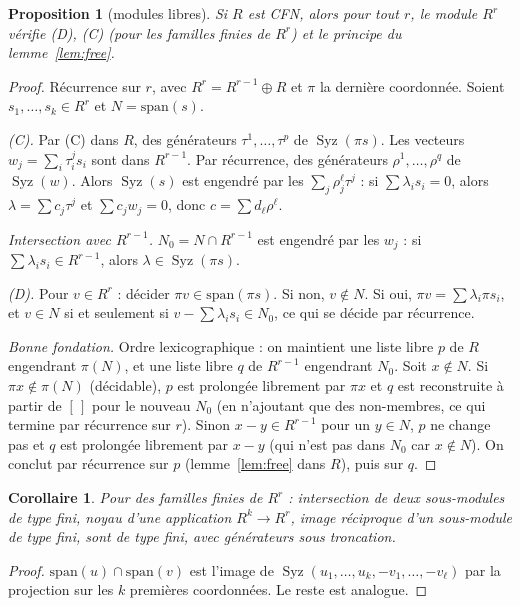 \documentclass[11pt]{amsart}
\newtheorem{proposition}[theorem]{Proposition}
\newtheorem{corollary}[theorem]{Corollaire}
\theoremstyle{definition}
\theoremstyle{remark}
\DeclareMathOperator{\Syz}{Syz}
\newcommand{\sm}{\mathrm{span}}
\begin{document}
\begin{proposition}[modules libres]\label{prop:free}
Si $R$ est CFN, alors pour tout $r$, le module $R^r$ vérifie (D), (C)
(pour les familles finies de $R^r$) et le principe du lemme~\ref{lem:free}.
\end{proposition}

\begin{proof}
Récurrence sur $r$, avec $R^r=R^{r-1}\oplus R$ et $\pi$ la dernière
coordonnée. Soient $s_1,\dots,s_k\in R^r$ et $N=\sm(s)$.

\emph{(C).} Par (C) dans $R$, des générateurs $\tau^1,\dots,\tau^p$ de
$\Syz(\pi s)$. Les vecteurs $w_j=\sum_i\tau^j_is_i$ sont dans $R^{r-1}$.
Par récurrence, des générateurs $\rho^1,\dots,\rho^q$ de $\Syz(w)$.
Alors $\Syz(s)$ est engendré par les $\sum_j\rho^\ell_j\tau^j$ : si
$\sum\lambda_is_i=0$, alors $\lambda=\sum c_j\tau^j$ et $\sum c_jw_j=0$,
donc $c=\sum d_\ell\rho^\ell$.

\emph{Intersection avec $R^{r-1}$.} $N_0=N\cap R^{r-1}$ est engendré par
les $w_j$ : si $\sum\lambda_is_i\in R^{r-1}$, alors $\lambda\in\Syz(\pi s)$.

\emph{(D).} Pour $v\in R^r$ : décider $\pi v\in\sm(\pi s)$. Si non,
$v\notin N$. Si oui, $\pi v=\sum\lambda_i\pi s_i$, et $v\in N$ si et
seulement si $v-\sum\lambda_is_i\in N_0$, ce qui se décide par
récurrence.

\emph{Bonne fondation.} Ordre lexicographique : on maintient une liste
libre $p$ de $R$ engendrant $\pi(N)$, et une liste libre $q$ de $R^{r-1}$
engendrant $N_0$. Soit $x\notin N$. Si $\pi x\notin\pi(N)$ (décidable),
$p$ est prolongée librement par $\pi x$ et $q$ est reconstruite à partir
de $[\,]$ pour le nouveau $N_0$ (en n'ajoutant que des non-membres, ce
qui termine par récurrence sur $r$). Sinon $x-y\in R^{r-1}$ pour un
$y\in N$, $p$ ne change pas et $q$ est prolongée librement par $x-y$
(qui n'est pas dans $N_0$ car $x\notin N$). On conclut par récurrence
sur $p$ (lemme~\ref{lem:free} dans $R$), puis sur $q$.
\end{proof}

\begin{corollary}\label{cor:inter}
Pour des familles finies de $R^r$ : intersection de deux sous-modules
de type fini, noyau d'une application $R^k\to R^r$, image réciproque
d'un sous-module de type fini, sont de type fini, avec générateurs
sous troncation.
\end{corollary}

\begin{proof}
$\sm(u)\cap\sm(v)$ est l'image de $\Syz(u_1,\dots,u_k,-v_1,\dots,-v_\ell)$
par la projection sur les $k$ premières coordonnées. Le reste est
analogue.
\end{proof}
\end{document}
